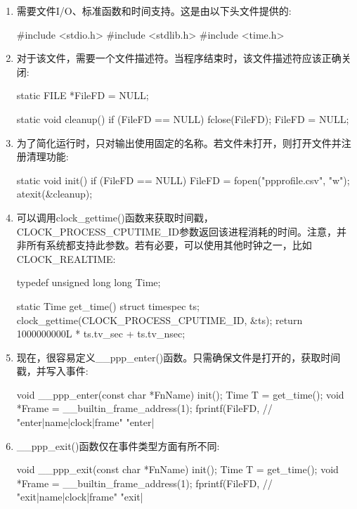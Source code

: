 \begin{enumerate}
\item
需要文件I/O、标准函数和时间支持。这是由以下头文件提供的:

\begin{cpp}
#include <stdio.h>
#include <stdlib.h>
#include <time.h>
\end{cpp}

\item
对于该文件，需要一个文件描述符。当程序结束时，该文件描述符应该正确关闭:

\begin{cpp}
static FILE *FileFD = NULL;

static void cleanup() {
    if (FileFD == NULL) {
        fclose(FileFD);
        FileFD = NULL;
    }
}
\end{cpp}

\item
为了简化运行时，只对输出使用固定的名称。若文件未打开，则打开文件并注册清理功能:

\begin{cpp}
static void init() {
    if (FileFD == NULL) {
        FileFD = fopen("ppprofile.csv", "w");
        atexit(&cleanup);
    }
}
\end{cpp}

\item
可以调用clock\_gettime()函数来获取时间戳，CLOCK\_PROCESS\_CPUTIME\_ID参数返回该进程消耗的时间。注意，并非所有系统都支持此参数。若有必要，可以使用其他时钟之一，比如CLOCK\_REALTIME:

\begin{cpp}
typedef unsigned long long Time;

static Time get_time() {
    struct timespec ts;
    clock_gettime(CLOCK_PROCESS_CPUTIME_ID, &ts);
    return 1000000000L * ts.tv_sec + ts.tv_nsec;
}
\end{cpp}

\item
现在，很容易定义\_\_ppp\_enter()函数。只需确保文件是打开的，获取时间戳，并写入事件:

\begin{cpp}
void __ppp_enter(const char *FnName) {
    init();
    Time T = get_time();
    void *Frame = __builtin_frame_address(1);
    fprintf(FileFD,
            // "enter|name|clock|frame"
            "enter|%
}
\end{cpp}

\item
\_\_ppp\_exit()函数仅在事件类型方面有所不同:

\begin{cpp}
void __ppp_exit(const char *FnName) {
    init();
    Time T = get_time();
    void *Frame = __builtin_frame_address(1);
    fprintf(FileFD,
    // "exit|name|clock|frame"
    "exit|%
}
\end{cpp}

\end{enumerate}

